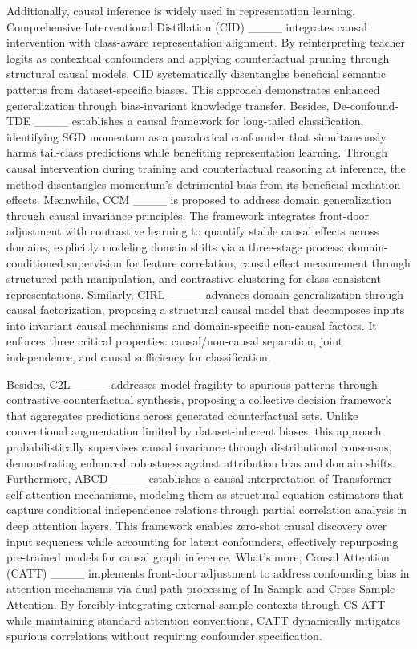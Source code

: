 Additionally, causal inference is widely used in representation learning. Comprehensive Interventional Distillation (CID) ____ integrates causal intervention with class-aware representation alignment. By reinterpreting teacher logits as contextual confounders and applying counterfactual pruning through structural causal models, CID systematically disentangles beneficial semantic patterns from dataset-specific biases. This approach demonstrates enhanced generalization through bias-invariant knowledge transfer. Besides, De-confound-TDE ____ establishes a causal framework for long-tailed classification, identifying SGD momentum as a paradoxical confounder that simultaneously harms tail-class predictions while benefiting representation learning. Through causal intervention during training and counterfactual reasoning at inference, the method disentangles momentum’s detrimental bias from its beneficial mediation effects. Meanwhile, CCM ____ is proposed to address domain generalization through causal invariance principles. The framework integrates front-door adjustment with contrastive learning to quantify stable causal effects across domains, explicitly modeling domain shifts via a three-stage process: domain-conditioned supervision for feature correlation, causal effect measurement through structured path manipulation, and contrastive clustering for class-consistent representations. Similarly, CIRL ____ advances domain generalization through causal factorization, proposing a structural causal model that decomposes inputs into invariant causal mechanisms and domain-specific non-causal factors. It enforces three critical properties: causal/non-causal separation, joint independence, and causal sufficiency for classification. 

Besides, C2L ____ addresses model fragility to spurious patterns through contrastive counterfactual synthesis, proposing a collective decision framework that aggregates predictions across generated counterfactual sets. Unlike conventional augmentation limited by dataset-inherent biases, this approach probabilistically supervises causal invariance through distributional consensus, demonstrating enhanced robustness against attribution bias and domain shifts. Furthermore, ABCD ____ establishes a causal interpretation of Transformer self-attention mechanisms, modeling them as structural equation estimators that capture conditional independence relations through partial correlation analysis in deep attention layers. This framework enables zero-shot causal discovery over input sequences while accounting for latent confounders, effectively repurposing pre-trained models for causal graph inference. What’s more, Causal Attention (CATT) ____ implements front-door adjustment to address confounding bias in attention mechanisms via dual-path processing of In-Sample and Cross-Sample Attention. By forcibly integrating external sample contexts through CS-ATT while maintaining standard attention conventions, CATT dynamically mitigates spurious correlations without requiring confounder specification. 

